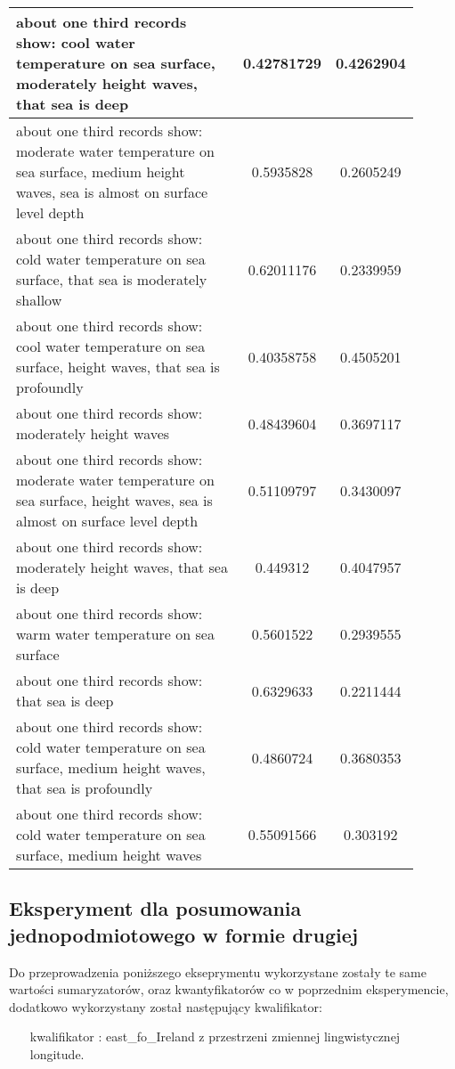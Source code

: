 \documentclass{article}
\begin{document}
\begin{longtable}{|p{0.9\linewidth}|c|c|}
about one third records show: cool water temperature on sea surface, moderately height waves, that sea is deep & 0.42781729 & 0.4262904 \\ \hline
about one third records show: moderate water temperature on sea surface, medium height waves, sea is almost on surface level depth & 0.5935828 & 0.2605249 \\ \hline
about one third records show: cold water temperature on sea surface, that sea is moderately shallow & 0.62011176 & 0.2339959 \\ \hline
about one third records show: cool water temperature on sea surface, height waves, that sea is profoundly & 0.40358758 & 0.4505201 \\ \hline
about one third records show: moderately height waves & 0.48439604 & 0.3697117 \\ \hline
about one third records show: moderate water temperature on sea surface, height waves, sea is almost on surface level depth & 0.51109797 & 0.3430097 \\ \hline
about one third records show: moderately height waves, that sea is deep & 0.449312 & 0.4047957 \\ \hline
about one third records show: warm water temperature on sea surface & 0.5601522 & 0.2939555 \\ \hline
about one third records show: that sea is deep & 0.6329633 & 0.2211444 \\ \hline
about one third records show: cold water temperature on sea surface, medium height waves, that sea is profoundly & 0.4860724 & 0.3680353 \\ \hline
about one third records show: cold water temperature on sea surface, medium height waves & 0.55091566 & 0.303192 \\ \hline
\hline
\end{longtable}

\subsection{Eksperyment dla posumowania jednopodmiotowego w formie drugiej}

Do przeprowadzenia poniższego ekseprymentu wykorzystane zostały te same wartości sumaryzatorów, oraz kwantyfikatorów co w poprzednim eksperymencie, dodatkowo wykorzystany został następujący kwalifikator:

\begin{itemize}
    \item[kwalifikator]: east\_fo\_Ireland z przestrzeni zmiennej lingwistycznej longitude.
\end{itemize}
\end{document}
